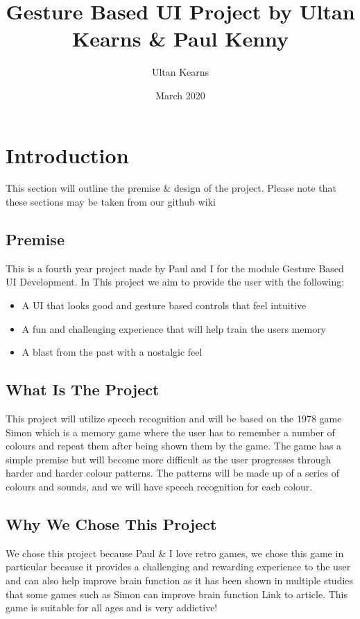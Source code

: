 \documentclass{article}
\title{Gesture Based UI Project by Ultan Kearns \& Paul Kenny}
\author{Ultan Kearns}
\date{March 2020}
\begin{document}
\maketitle
\newpage
\tableofcontents
\newpage

\section{Introduction}
This section will outline the premise \& design of the project. Please note that these sections may be taken from our github wiki\cite{githubwiki}
\subsection{Premise}
This is a fourth year project made by Paul and I for the module Gesture Based UI Development. In This project we aim to provide the user with the following:
    \begin{itemize}
    \item A UI that looks good and gesture based controls that feel intuitive
    \item A fun and challenging experience that will help train the users memory
    \item A blast from the past with a nostalgic feel
    \end{itemize}{}
\subsection{What Is The Project}
This project will utilize speech recognition and will be based on the 1978 game Simon\cite{Simon} which is a memory game where the user has to remember a number of colours and repeat them after being shown them by the game. The game has a simple premise but will become more difficult as the user progresses through harder and harder colour patterns. The patterns will be made up of a series of colours and sounds, and we will have speech recognition for each colour.
\subsection{Why We Chose This Project}
We chose this project because Paul \& I love retro games, we chose this game in particular because it provides a challenging and rewarding experience to the user and can also help improve brain function as it has been shown in multiple studies that some games such as Simon can improve brain function Link to article. This game is suitable for all ages and is very addictive!
\end{document}
